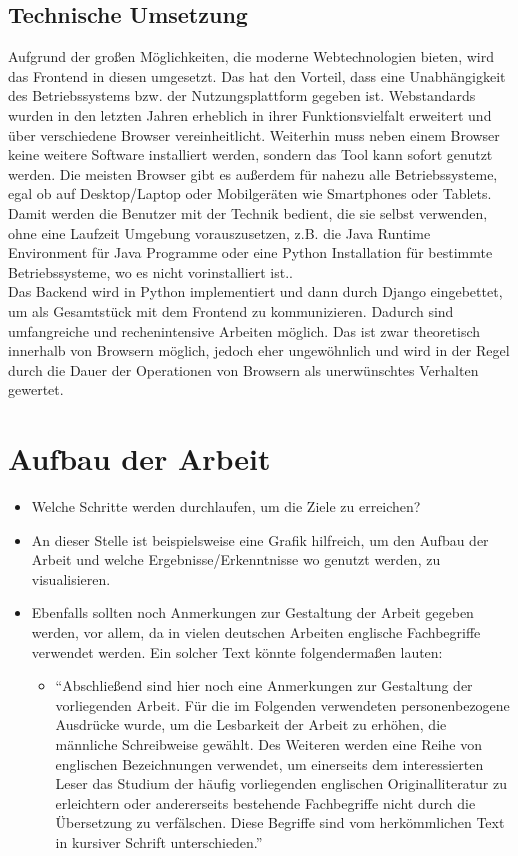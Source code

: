 \subsection{Technische Umsetzung}
Aufgrund der großen Möglichkeiten, die moderne Webtechnologien bieten, wird das
Frontend in diesen umgesetzt. Das hat den Vorteil, dass eine Unabhängigkeit des
Betriebssystems bzw. der Nutzungsplattform gegeben ist. Webstandards wurden in
den letzten Jahren erheblich in ihrer Funktionsvielfalt erweitert und über
verschiedene Browser vereinheitlicht. Weiterhin muss neben einem Browser keine
weitere Software installiert werden, sondern das Tool kann sofort genutzt
werden. Die meisten Browser gibt es außerdem für nahezu alle Betriebssysteme,
egal ob auf Desktop/Laptop oder Mobilgeräten wie Smartphones oder Tablets. Damit
werden die Benutzer mit der Technik bedient, die sie selbst verwenden, ohne
eine Laufzeit Umgebung vorauszusetzen, z.B. die Java Runtime Environment für
Java Programme oder eine Python Installation für bestimmte
Betriebssysteme, wo es nicht vorinstalliert ist..\\
Das Backend wird in Python implementiert und dann durch Django eingebettet, um
als Gesamtstück mit dem Frontend zu kommunizieren. Dadurch sind umfangreiche und
rechenintensive Arbeiten möglich. Das ist zwar theoretisch innerhalb von
Browsern möglich, jedoch eher ungewöhnlich und wird in der Regel durch die Dauer
der Operationen von Browsern als unerwünschtes Verhalten gewertet.

\section{Aufbau der Arbeit}
\begin{itemize}
	\item Welche Schritte werden durchlaufen, um die Ziele zu erreichen?
	\item An dieser Stelle ist beispielsweise eine Grafik hilfreich, um den Aufbau der Arbeit und welche Ergebnisse/Erkenntnisse wo genutzt werden, zu visualisieren. 
	\item Ebenfalls sollten noch Anmerkungen zur Gestaltung der Arbeit gegeben werden, vor allem, da in vielen deutschen Arbeiten englische Fachbegriffe verwendet werden. Ein solcher Text könnte folgendermaßen lauten: 
		\begin{itemize}
			\item ``Abschließend sind hier noch eine Anmerkungen zur Gestaltung der vorliegenden Arbeit. Für die im Folgenden verwendeten personenbezogene Ausdrücke wurde, um die Lesbarkeit der Arbeit zu erhöhen, die männliche Schreibweise gewählt. Des Weiteren werden eine Reihe von englischen Bezeichnungen verwendet, um einerseits dem interessierten Leser das Studium der häufig vorliegenden englischen Originalliteratur zu erleichtern oder andererseits bestehende Fachbegriffe nicht durch die Übersetzung zu verfälschen. Diese Begriffe sind vom herkömmlichen Text in kursiver Schrift unterschieden.''
		\end{itemize}
\end{itemize}

